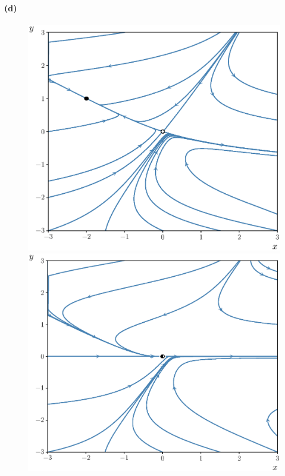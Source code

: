 \documentclass{article}
\begin{document}
\paragraph{(d)}
\begin{figure}
	\hspace{-0.6in}
	\includegraphics[scale=0.5]{Exam_Q_Phase_Portrait_Neg_Mu.eps}
	\includegraphics[scale=0.5]{Exam_Q_Phase_Portrait_Mid_Mu.eps}
	\vspace{-0.05in}

\end{figure}
\end{document}
